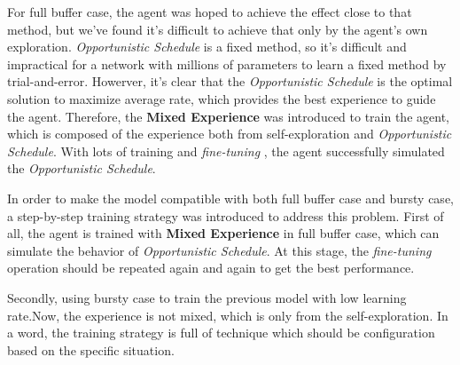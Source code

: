 \documentclass{article}
\begin{document}
For full buffer case, the agent was hoped to achieve the effect close to that method, 
but we've found it's difficult to achieve that only by the agent's own exploration.
\textit{Opportunistic Schedule} is a fixed method, 
so it's difficult and impractical for a network with millions of parameters to learn a fixed method by trial-and-error.
Howerver, it's clear that the \textit{Opportunistic Schedule} is the optimal solution to maximize average rate, 
which provides the best experience to guide the agent.
Therefore, the \textbf{Mixed Experience} was introduced to train the agent, which is composed of the experience both from self-exploration and \textit{Opportunistic Schedule}.
With lots of training and \textit{fine-tuning} \cite{HowardUniversal}, the agent successfully simulated the \textit{Opportunistic Schedule}.

In order to make the model compatible with both full buffer case and bursty case, a step-by-step training strategy was introduced to address this problem.
First of all, the agent is trained with \textbf{Mixed Experience} in full buffer case, which can simulate the behavior of \textit{Opportunistic Schedule}.
At this stage, the \textit{fine-tuning} operation should be repeated again and again to get the best performance.

Secondly, using bursty case to train the previous model with low learning rate.Now, the experience is not mixed, which is only from the self-exploration.
In a word, the training strategy is full of technique which should be configuration based on the specific situation.



\end{document}
